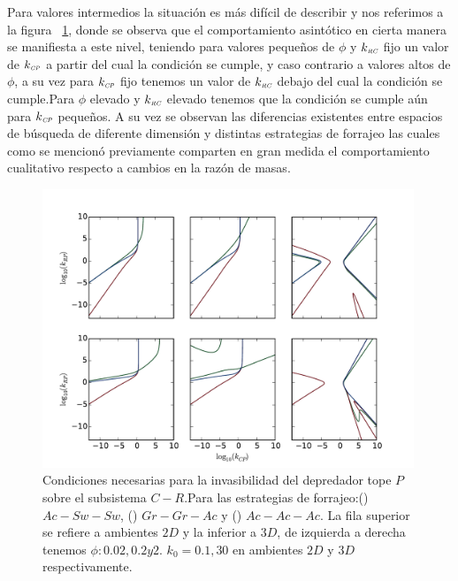 Para valores intermedios la situaci\'on es m\'as dif\'icil de describir y nos referimos a la figura  ~\ref{fig:NC_PCR}, donde se observa que el comportamiento asint\'otico en cierta manera se manifiesta a este nivel, teniendo para valores peque\~nos de $\phi$ y $k_{\textit{\tiny RC}}$ fijo un valor de $k_{\textit{\tiny CP}}$ a partir del cual la condici\'on se cumple, y caso contrario a valores altos de $\phi$, a su vez para $k_{\textit{\tiny CP}}$ fijo tenemos un valor de $k_{\textit{\tiny RC}}$ debajo del cual la condici\'on se cumple.Para $\phi$ elevado y $k_{\textit{\tiny RC}}$ elevado tenemos que la condici\'on se cumple a\'un para $k_{\textit{\tiny CP}}$ peque\~nos. A su vez se observan las diferencias existentes entre espacios de b\'usqueda de diferente dimensi\'on y distintas estrategias de forrajeo las cuales como se mencion\'o previamente comparten en gran medida el comportamiento cualitativo respecto a cambios en la raz\'on de masas.

\begin{figure}
  \centering
  \includegraphics[width = 0.99\textwidth]{./Plots/NecessityPCR.pdf}
  \caption[Condiciones Necesarias $P \to C-R$]{Condiciones necesarias para la invasibilidad del depredador tope $P$ sobre el subsistema $C-R$.Para las estrategias de forrajeo:({\hwplotR}) $Ac-Sw-Sw$, ({\hwplotG}) $Gr-Gr-Ac$ y ({\hwplotB}) $Ac-Ac-Ac$. La fila superior se refiere a ambientes $2D$ y la inferior a $3D$, de izquierda a derecha tenemos $\phi : 0.02,0.2 y 2$. $k_0= 0.1,30$ en ambientes $2D$ y $3D$ respectivamente.}
  \label{fig:NC_PCR}
\end{figure}

